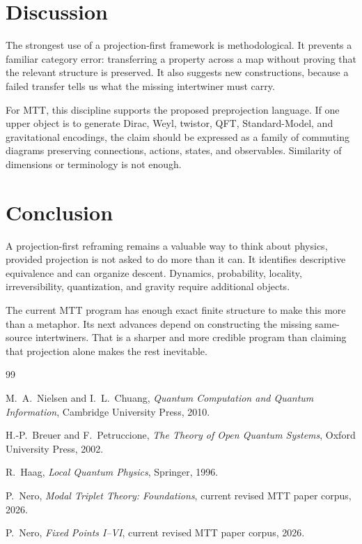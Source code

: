 \documentclass[11pt]{article}
\begin{document}
\section{Discussion}

The strongest use of a projection-first framework is methodological. It
prevents a familiar category error: transferring a property across a map
without proving that the relevant structure is preserved. It also suggests
new constructions, because a failed transfer tells us what the missing
intertwiner must carry.

For MTT, this discipline supports the proposed preprojection language. If
one upper object is to generate Dirac, Weyl, twistor, QFT, Standard-Model,
and gravitational encodings, the claim should be expressed as a family of
commuting diagrams preserving connections, actions, states, and observables.
Similarity of dimensions or terminology is not enough.

\section{Conclusion}

A projection-first reframing remains a valuable way to think about physics,
provided projection is not asked to do more than it can. It identifies
descriptive equivalence and can organize descent. Dynamics, probability,
locality, irreversibility, quantization, and gravity require additional
objects.

The current MTT program has enough exact finite structure to make this more
than a metaphor. Its next advances depend on constructing the missing
same-source intertwiners. That is a sharper and more credible program than
claiming that projection alone makes the rest inevitable.

\begin{thebibliography}{99}

M.~A.~Nielsen and I.~L.~Chuang,
\emph{Quantum Computation and Quantum Information},
Cambridge University Press, 2010.

H.-P.~Breuer and F.~Petruccione,
\emph{The Theory of Open Quantum Systems},
Oxford University Press, 2002.

R.~Haag,
\emph{Local Quantum Physics},
Springer, 1996.

P.~Nero,
\emph{Modal Triplet Theory: Foundations},
current revised MTT paper corpus, 2026.

P.~Nero,
\emph{Fixed Points I--VI},
current revised MTT paper corpus, 2026.

\end{thebibliography}
\end{document}
